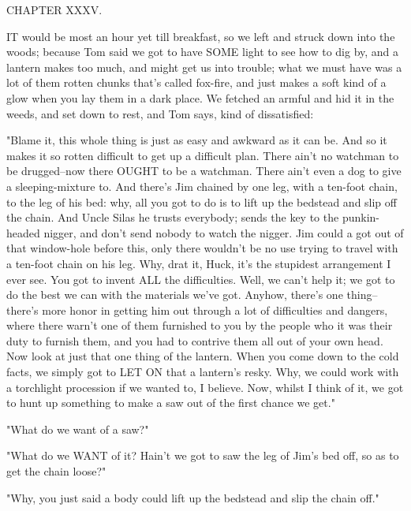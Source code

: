 CHAPTER XXXV.

IT would be most an hour yet till breakfast, so we left and struck down
into the woods; because Tom said we got to have SOME light to see how to
dig by, and a lantern makes too much, and might get us into trouble; what
we must have was a lot of them rotten chunks that's called fox-fire, and
just makes a soft kind of a glow when you lay them in a dark place.  We
fetched an armful and hid it in the weeds, and set down to rest, and Tom
says, kind of dissatisfied:

"Blame it, this whole thing is just as easy and awkward as it can be.
And so it makes it so rotten difficult to get up a difficult plan.  There
ain't no watchman to be drugged--now there OUGHT to be a watchman.  There
ain't even a dog to give a sleeping-mixture to.  And there's Jim chained
by one leg, with a ten-foot chain, to the leg of his bed:  why, all you
got to do is to lift up the bedstead and slip off the chain.  And Uncle
Silas he trusts everybody; sends the key to the punkin-headed nigger, and
don't send nobody to watch the nigger.  Jim could a got out of that
window-hole before this, only there wouldn't be no use trying to travel
with a ten-foot chain on his leg.  Why, drat it, Huck, it's the stupidest
arrangement I ever see. You got to invent ALL the difficulties.  Well, we
can't help it; we got to do the best we can with the materials we've got.
Anyhow, there's one thing--there's more honor in getting him out
through a lot of difficulties and dangers, where there warn't one of them
furnished to you by the people who it was their duty to furnish them, and
you had to contrive them all out of your own head.  Now look at just that
one thing of the lantern.  When you come down to the cold facts, we
simply got to LET ON that a lantern's resky.  Why, we could work with a
torchlight procession if we wanted to, I believe.  Now, whilst I think of
it, we got to hunt up something to make a saw out of the first chance we
get."

"What do we want of a saw?"

"What do we WANT of it?  Hain't we got to saw the leg of Jim's bed
off, so as to get the chain loose?"

"Why, you just said a body could lift up the bedstead and slip the chain
off."

